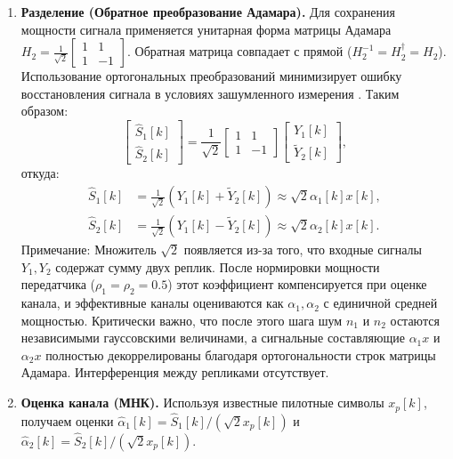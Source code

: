 \documentclass[a4paper,12pt]{article}
\numberwithin{equation}{section}
\begin{document}
\begin{enumerate}
    \item \textbf{Разделение (Обратное преобразование Адамара).} Для сохранения мощности сигнала применяется унитарная форма матрицы Адамара $H_2 = \frac{1}{\sqrt{2}}\begin{bmatrix} 1 & 1 \\ 1 & -1 \end{bmatrix}$. Обратная матрица совпадает с прямой ($H_2^{-1} = H_2^\dagger = H_2$). Использование ортогональных преобразований минимизирует ошибку восстановления сигнала в условиях зашумленного измерения \cite{tropp}. Таким образом:
    \begin{equation}
    \begin{bmatrix} \hat{S}_1[k] \\ \hat{S}_2[k] \end{bmatrix} =\frac{1}{\sqrt{2}}\begin{bmatrix} 1 & 1 \\ 1 & -1 \end{bmatrix}\begin{bmatrix} Y_1[k] \\ \tilde{Y}_2[k] \end{bmatrix},\label{eq:hadamard}
    \end{equation}
    откуда:
    \begin{align}
    \hat{S}_1[k] &= \frac{1}{\sqrt{2}} \left( Y_1[k] + \tilde{Y}_2[k] \right) \approx \sqrt{2} \alpha_1[k] x[k], \\
    \hat{S}_2[k] &= \frac{1}{\sqrt{2}} \left( Y_1[k] - \tilde{Y}_2[k] \right) \approx \sqrt{2} \alpha_2[k] x[k].
    \end{align}
    Примечание: Множитель $\sqrt{2}$ появляется из-за того, что входные сигналы $Y_1, Y_2$ содержат сумму двух реплик. После нормировки мощности передатчика ($\rho_1=\rho_2=0.5$) этот коэффициент компенсируется при оценке канала, и эффективные каналы оцениваются как $\alpha_1, \alpha_2$ с единичной средней мощностью. Критически важно, что после этого шага шум $n_1$ и $n_2$ остаются независимыми гауссовскими величинами, а сигнальные составляющие $\alpha_1 x$ и $\alpha_2 x$ полностью декоррелированы благодаря ортогональности строк матрицы Адамара. Интерференция между репликами отсутствует.
    
    \item \textbf{Оценка канала (МНК).} Используя известные пилотные символы $x_p[k]$, получаем оценки $\hat{\alpha}_1[k] = \hat{S}_1[k] / (\sqrt{2} x_p[k])$ и $\hat{\alpha}_2[k] = \hat{S}_2[k] / (\sqrt{2} x_p[k])$. 
    

\end{enumerate}
\end{document}
